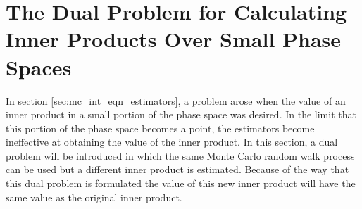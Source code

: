 \section{The Dual Problem for Calculating Inner Products Over Small Phase 
  Spaces}
\label{sec:dual_problems}
In section \ref{sec:mc_int_eqn_estimators}, a problem arose when the value of 
an inner product in a small portion of the phase space was desired. In the 
limit that this portion of the phase space becomes a point, the estimators 
become ineffective at obtaining the value of the inner product. In this 
section, a dual problem will be introduced in which the same Monte Carlo 
random walk process can be used but a different inner product is estimated. 
Because of the way that this dual problem is formulated the value of this new 
inner product will have the same value as the original inner product. 

